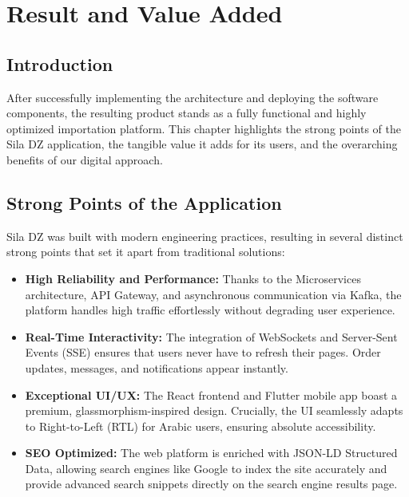 \chapter{Result and Value Added}

\section{Introduction}
After successfully implementing the architecture and deploying the software components, the resulting product stands as a fully functional and highly optimized importation platform. This chapter highlights the strong points of the Sila DZ application, the tangible value it adds for its users, and the overarching benefits of our digital approach.

\section{Strong Points of the Application}
Sila DZ was built with modern engineering practices, resulting in several distinct strong points that set it apart from traditional solutions:
\begin{itemize}
    \item \textbf{High Reliability and Performance:} Thanks to the Microservices architecture, API Gateway, and asynchronous communication via Kafka, the platform handles high traffic effortlessly without degrading user experience.
    \item \textbf{Real-Time Interactivity:} The integration of WebSockets and Server-Sent Events (SSE) ensures that users never have to refresh their pages. Order updates, messages, and notifications appear instantly.
    \item \textbf{Exceptional UI/UX:} The React frontend and Flutter mobile app boast a premium, glassmorphism-inspired design. Crucially, the UI seamlessly adapts to Right-to-Left (RTL) for Arabic users, ensuring absolute accessibility.
    \item \textbf{SEO Optimized:} The web platform is enriched with JSON-LD Structured Data, allowing search engines like Google to index the site accurately and provide advanced search snippets directly on the search engine results page.
\end{itemize}


